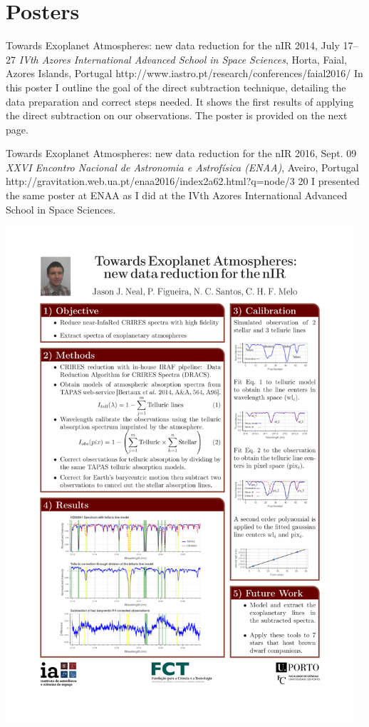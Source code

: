 \section{Posters}\label{app_sec:posters}

 {Towards Exoplanet Atmospheres: new data reduction for the nIR}%
{2014, July 17--27}%
{\textit{IVth Azores International Advanced School in Space Sciences}, Horta, Faial, Azores Islands, Portugal}%
{http://www.iastro.pt/research/conferences/faial2016/}%
{}%
{In this poster I outline the goal of the direct subtraction technique, detailing the data preparation and correct steps needed. It shows the first results of applying the direct subtraction on our observations. The poster is provided on the next page.}%


 {Towards Exoplanet Atmospheres: new data reduction for the nIR}%
{2016, Sept. 09}%
{\textit{XXVI Encontro Nacional de Astronomia e Astrofísica (ENAA)}, Aveiro, Portugal}%
{ http://gravitation.web.ua.pt/enaa2016/index2a62.html?q=node/3}%
{20}%
{I presented the same poster at ENAA as I did at the IVth Azores International Advanced School in Space Sciences.}

{\centering \includegraphics[width=0.97\textwidth, keepaspectratio=true, page = 1, trim = 1.5cm 1cm 1.5cm 1cm, clip = true]{appendices/papers/Azores2016_Final}}
